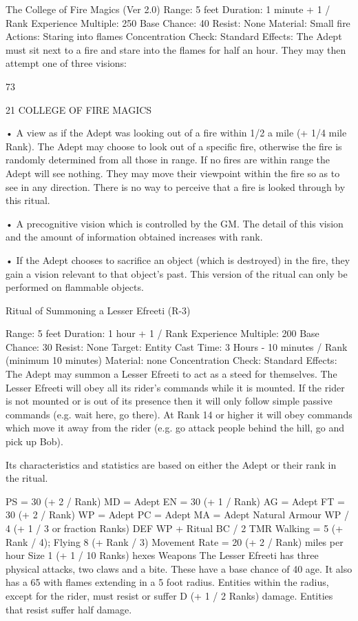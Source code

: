 \begin{Chapter}{The College of Fire Magics (Ver 2.0)}
Range: 5 feet 
Duration: 1 minute + 1 / Rank 
Experience Multiple: 250 
Base Chance: 40%
Resist: None 
Material: Small fire 
Actions: Staring into flames 
Concentration Check: Standard 
Effects: The Adept must sit next to a fire and stare 
into  the  flames  for  half  an  hour.  They  may  then 
attempt one of three visions:  

73 

21 COLLEGE OF FIRE MAGICS 

•  A view as if the Adept was looking out of  a fire 
within  1/2  a  mile  (+  1/4  mile  Rank).  The  Adept 
may choose to look out of a specific fire, otherwise 
the  fire  is  randomly  determined  from  all  those  in 
range.  If  no  fires  are  within  range  the  Adept  will 
see  nothing.  They  may  move  their  viewpoint 
within the fire so as to see in any direction. There 
is no way to perceive that a fire is looked through 
by this ritual.  

•  A  precognitive  vision  which is  controlled  by  the 
GM.  The  detail  of  this  vision  and  the  amount  of 
information obtained increases with rank.  

• If the Adept chooses to sacrifice an object (which 
is destroyed) in the fire, they gain a vision relevant 
to  that  object’s past.  This  version  of  the  ritual  can 
only be performed on flammable objects. 

Ritual of Summoning a Lesser Efreeti (R-3) 

Range: 5 feet 
Duration: 1 hour + 1 / Rank 
Experience Multiple: 200 
Base Chance: 30%
Resist: None 
Target: Entity 
Cast Time: 3 Hours - 10 minutes / Rank (minimum 
10 minutes) 
Material: none 
Concentration Check: Standard 
Effects:  The  Adept  may  summon  a  Lesser  Efreeti 
to act as a steed for themselves. The Lesser Efreeti 
will  obey  all  its  rider’s  commands  while  it  is 
mounted. If the rider is not mounted or is out of its 
presence  then  it  will  only  follow  simple  passive 
commands (e.g. wait here, go there). At Rank 14 or 
higher it will obey commands which move it away 
from the rider (e.g. go attack people behind the hill, 
go and pick up Bob). 

Its characteristics and statistics are based on either 
the Adept or their rank in the ritual. 

PS = 30 (+ 2 / Rank)  MD = Adept 
EN = 30 (+ 1 / Rank)  AG = Adept 
FT = 30 (+ 2 / Rank)  WP = Adept 
PC = Adept 
MA = Adept 
Natural Armour WP / 4 (+ 1 / 3 or fraction 
Ranks) 
DEF WP + Ritual BC / 2 
TMR Walking = 5 (+ Rank / 4); Flying 8 (+ Rank / 
3) 
Movement Rate = 20 (+ 2 / Rank) miles per hour 
Size 1 (+ 1 / 10 Ranks) hexes 
Weapons  The  Lesser  Efreeti  has  three  physical 
attacks,  two  claws  and  a  bite.  These  have  a  base 
chance of 40%
age.  It  also  has  a  65%
with  flames  extending  in  a  5  foot  radius.  Entities 
within  the  radius,  except  for  the  rider,  must  resist 
or  suffer  D  (+  1  /  2  Ranks)  damage.  Entities  that 
resist suffer half damage. 


\end{Chapter}
